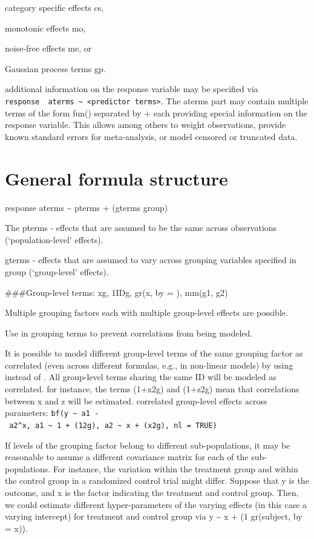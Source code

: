 \documentclass[]{book}
\begin{document}
category specific effects cs,

monotonic effects mo,

noise-free effects me, or

Gaussian process terms gp.

additional information on the response variable may be specified via
\texttt{response\ \textbar{}\ aterms\ \textasciitilde{}\ \textless{}predictor\ terms\textgreater{}}. The aterms part may contain multiple terms of the form fun() separated by + each providing special information on the response variable. This allows among others to weight observations, provide known standard errors for meta-analysis, or model censored or truncated data.

\hypertarget{general-formula-structure}{%
\section{General formula structure}\label{general-formula-structure}}

response \textbar{} aterms \textasciitilde{} pterms + (gterms \textbar{} group)

The pterms - effects that are assumed to be the same across observations (`population-level' effects).

gterms - effects that are assumed to vary across grouping variables specified in group (`group-level' effects).

\#\#\#Group-level terms: x\textbar{}\textbar{}g, 1\textbar{}ID\textbar{}g, gr(x, by = ), mm(g1, g2)

Multiple grouping factors each with multiple group-level effects are possible.

Use \textbar{}\textbar{} in grouping terms to prevent correlations from being modeled.

It is possible to model different group-level terms of the same grouping factor as correlated (even across different formulas, e.g., in non-linear models) by using \textbar{}\textbar{} instead of \textbar{}. All group-level terms sharing the same ID will be modeled as correlated. for instance, the terms (1+x\textbar{}2\textbar{}g) and (1+z\textbar{}2\textbar{}g) mean that correlations between x and z will be estimated.
correlated group-level effects across parameters:
\texttt{bf(y\ \textasciitilde{}\ a1\ -\ a2\^{}x,\ a1\ \textasciitilde{}\ 1\ +\ (1\textbar{}2\textbar{}g),\ a2\ \textasciitilde{}\ x\ +\ (x\textbar{}2\textbar{}g),\ nl\ =\ TRUE)}

If levels of the grouping factor belong to different sub-populations, it may be reasonable to assume a different covariance matrix for each of the sub-populations. For instance, the variation within the treatment group and within the control group in a randomized control trial might differ. Suppose that y is the outcome, and x is the factor indicating the treatment and control group. Then, we could estimate different hyper-parameters of the varying effects (in this case a varying intercept) for treatment and control group via y \textasciitilde{} x + (1 \textbar{} gr(subject, by = x)).
\end{document}

